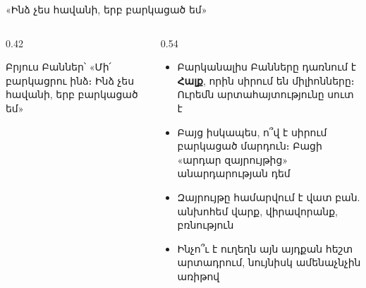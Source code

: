 
\begin{frame}{«Ինձ չես հավանի, երբ բարկացած եմ»}
  \begin{columns}[c]
    \begin{column}{0.42\textwidth}
      \centering
      \par\medskip
      \begin{card}[colback=mint!40!cardwhite]
        \centering Բրյուս Բաններ՝ «Մի՛ բարկացրու ինձ։ Ինձ չես հավանի, երբ բարկացած եմ»
      \end{card}
    \end{column}
    \begin{column}{0.54\textwidth}
      \begin{itemize}
        \item<2-> Բարկանալիս Բանները դառնում է \textbf{Հալք}, որին սիրում են միլիոնները։ Ուրեմն արտահայտությունը սուտ է
        \item<3-> Բայց իսկապես, ո՞վ է սիրում բարկացած մարդուն։ Բացի «արդար զայրույթից» անարդարության դեմ
        \item<4-> Զայրույթը համարվում է վատ բան. անխոհեմ վարք, վիրավորանք, բռնություն
        \item<5-> Ինչո՞ւ է ուղեղն այն այդքան հեշտ արտադրում, նույնիսկ ամենաչնչին առիթով
      \end{itemize}
    \end{column}
  \end{columns}
\end{frame}

